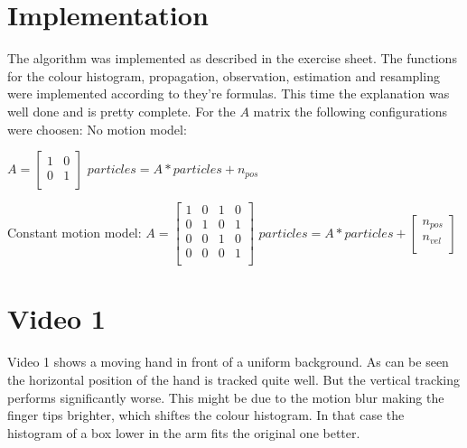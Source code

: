 \documentclass[12pt]{article}
\begin{document}
\maketitle


\section{Implementation }

The algorithm was implemented as described in the exercise sheet. The functions for the colour histogram, propagation, observation, estimation and resampling were implemented according to they're formulas. This time the explanation was well done and is pretty complete.
\newline
For the $A$ matrix the following configurations were choosen:
\newline 
\vspace{5mm}
No motion model: 

$ A = \left[ \begin{array}{rrrr}
1  & 0 \\
0 &  1 \\
\end{array}\right] $
\vspace{5mm}
\newline
$particles = A*particles + n_{pos}$

\vspace{5mm}

Constant motion model:
\vspace{5mm}
\newline
$ A = \left[ \begin{array}{rrrr}
1 & 0 & 1 & 0 \\
0 & 1 & 0 & 1 \\
0 & 0 & 1 & 0 \\
0 & 0 & 0 & 1 \\
\end{array}\right] $
\vspace{5mm}
\newline
$particles = A*particles +  \left[ \begin{array}{rrrr}
n_{pos} \\
n_{vel} \\
\end{array}\right]$

\section{Video 1}

Video 1 shows a moving hand in front of a uniform background. As can be seen the horizontal position of the hand is tracked quite well. But the vertical tracking performs significantly worse. This might be due to the motion blur making the finger tips brighter, which shiftes the colour histogram. In that case the histogram of a box lower in the arm fits the original one better.
\end{document}
